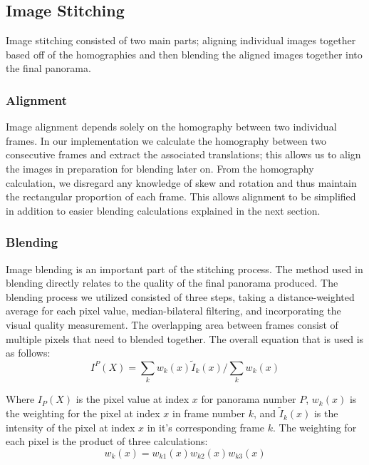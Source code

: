 \subsection{Image Stitching} \label{sec:ImageStitch}
Image stitching consisted of two main parts; aligning individual images together based off of the homographies 
and then blending the aligned images together into the final panorama. 

\subsubsection{Alignment}
Image alignment depends solely on the homography between two individual frames. In our implementation we 
calculate the homography between two consecutive frames and extract the associated translations; this allows
us to align the images in preparation for blending later on. From the homography calculation, we disregard
any knowledge of skew and rotation and thus maintain the rectangular proportion of each frame. This allows 
alignment to be simplified in addition to easier blending calculations explained in the next section.

\subsubsection{Blending}
Image blending is an important part of the stitching process. The method used in blending directly relates to
the quality of the final panorama produced. The blending process we utilized consisted of three steps, taking
a distance-weighted average for each pixel value, median-bilateral filtering, and incorporating the visual 
quality measurement. The overlapping area between frames consist of multiple pixels that need to blended 
together. The overall equation that is used is as follows:
\begin{equation}
I^P(X)=\displaystyle\sum_{k} w_k(x)\tilde{I}_k(x)/\displaystyle\sum_{k} w_k(x)
\end{equation}

Where $I_P(X)$ is the pixel value at index $x$ for panorama number $P$, $w_k(x)$ is the weighting for the 
pixel at index $x$ in frame number $k$, and $\tilde{I}_k(x)$ is the intensity of the pixel at index $x$ in 
it's corresponding frame $k$. The weighting for each pixel is the product of three calculations:
\begin{equation}
w_k(x) = w_{k1}(x)w_{k2}(x)w_{k3}(x)
\end{equation}

